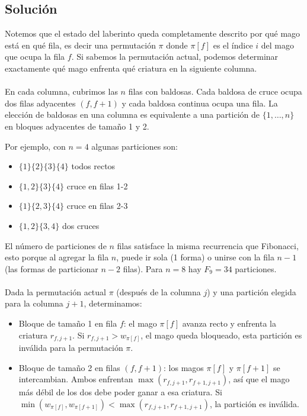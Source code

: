\subsection*{Solución}
Notemos que el estado del laberinto queda completamente descrito por qué mago está en qué fila, es decir una permutación $\pi$ donde $\pi[f]$ es el índice $i$ del mago que ocupa la fila $f$. Si sabemos la permutación actual, podemos determinar exactamente qué mago enfrenta qué criatura en la siguiente columna.
\\\\
En cada columna, cubrimos las $n$ filas con baldosas. Cada baldosa
de cruce ocupa dos filas adyacentes $(f, f+1)$ y cada baldosa
continua ocupa una fila. La elección de baldosas en una columna
es equivalente a una partición de $\{1,\ldots,n\}$ en
bloques adyacentes de tamaño 1 y 2.
 
Por ejemplo, con $n=4$ algunas particiones son:
\begin{itemize}
    \item $\{1\}\{2\}\{3\}\{4\}$  todos rectos
    \item $\{1,2\}\{3\}\{4\}$  cruce en filas 1-2
    \item $\{1\}\{2,3\}\{4\}$  cruce en filas 2-3
    \item $\{1,2\}\{3,4\}$  dos cruces
\end{itemize}
 
El número de particiones de $n$ filas satisface la misma recurrencia
que Fibonacci, esto porque al agregar la fila $n$, puede ir sola (1 forma) o unirse con la fila $n-1$ (las formas de particionar $n-2$ filas).
Para $n=8$ hay $F_9 = 34$ particiones.
\\\\ 
Dada la permutación actual $\pi$ (después de la columna $j$) y
una partición elegida para la columna $j+1$, determinamos:
 
\begin{itemize}
    \item Bloque de tamaño 1 en fila $f$: el mago $\pi[f]$
          avanza recto y enfrenta la criatura $r_{f,j+1}$. Si
          $r_{f,j+1} > w_{\pi[f]}$, el mago queda bloqueado,
          esta partición es inválida para la permutación $\pi$.
 
    \item Bloque de tamaño 2 en filas $(f, f+1)$: los
          magos $\pi[f]$ y $\pi[f+1]$ se intercambian. Ambos
          enfrentan $\max(r_{f,j+1}, r_{f+1,j+1})$, así que
          el mago más débil de los dos debe poder ganar a esa
          criatura. Si $\min(w_{\pi[f]}, w_{\pi[f+1]}) < \max(r_{f,j+1},
          r_{f+1,j+1})$, la partición es inválida.
\end{itemize}
 
